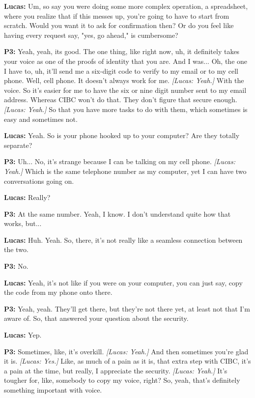 \textbf{Lucas:} Um, so say you were doing some more complex operation, a spreadsheet, where you realize that if this messes up, you're going to have to start from scratch. Would you want it to ask for confirmation then? Or do you feel like having every request say, "yes, go ahead," is cumbersome? 

\textbf{P3:} Yeah, yeah, its good. The one thing, like right now, uh, it definitely takes your voice as one of the proofs of identity that you are. And I was... Oh, the one I have to, uh, it'll send me a six-digit code to verify to my email or to my cell phone. Well, cell phone. It doesn't always work for me. \textit{[Lucas: Yeah.]} With the voice. So it's easier for me to have the six or nine digit number sent to my email address. Whereas CIBC won't do that. They don't figure that secure enough. \textit{[Lucas: Yeah.]} So that you have more tasks to do with them, which sometimes is easy and sometimes not. 

\textbf{Lucas:} Yeah. So is your phone hooked up to your computer? Are they totally separate? 

\textbf{P3:} Uh... No, it's strange because I can be talking on my cell phone. \textit{[Lucas: Yeah.]} Which is the same telephone number as my computer, yet I can have two conversations going on. 

\textbf{Lucas:} Really? 

\textbf{P3:} At the same number. Yeah, I know. I don't understand quite how that works, but... 

\textbf{Lucas:} Huh. Yeah. So, there, it's not really like a seamless connection between the two. 

\textbf{P3:} No. 

\textbf{Lucas:} Yeah, it's not like if you were on your computer, you can just say, copy the code from my phone onto there. 

\textbf{P3:} Yeah, yeah. They'll get there, but they're not there yet, at least not that I'm aware of. So, that answered your question about the security. 

\textbf{Lucas:} Yep. 

\textbf{P3:} Sometimes, like, it's overkill. \textit{[Lucas: Yeah.]} And then sometimes you're glad it is. \textit{[Lucas: Yes.]} Like, as much of a pain as it is, that extra step with CIBC, it's a pain at the time, but really, I appreciate the security. \textit{[Lucas: Yeah.]} It's tougher for, like, somebody to copy my voice, right? So, yeah, that's definitely something important with voice. 


